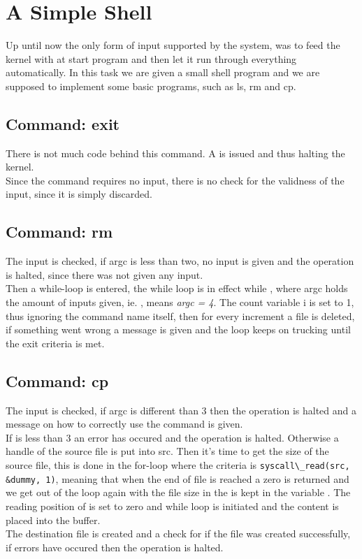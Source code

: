 %
%
%

\section{A Simple Shell}
Up until now the only form of input supported by the system, was to feed the
kernel with at start program and then let it run through everything
automatically. In this task we are given a small shell program and we are
supposed to implement some basic programs, such as ls, rm and cp.

\subsection{Command: exit}
There is not much code behind this command. A  is issued
and thus halting the kernel.\\
Since the command requires no input, there is no check for the validness of the
input, since it is simply discarded.

\subsection{Command: rm}
The input is checked, if argc is less than two, no input is given and the
operation is halted, since there was not given any input.\\
Then a while-loop is entered, the while loop is in effect while ,
where argc holds the amount of inputs given, ie. ,
means \textit{argc = 4}. The count variable i is set to 1, thus ignoring the
command name itself, then for every increment a file is deleted, if something
went wrong a message is given and the loop keeps on trucking until the exit
criteria is met. 

\subsection{Command: cp}
The input is checked, if argc is different than 3 then the operation is halted
and a message on how to correctly use the command is given.\\
If  is less than 3 an error has occured and the
operation is halted. Otherwise a handle of the source file is put into src. Then
it's time to get the size of the source file, this is done in the for-loop where
the criteria is \verb|syscall\_read(src, &dummy, 1)|, meaning that when the end
of file is reached a zero is returned and we get out of the loop again with the
file size in the is kept in the variable . The reading position of
 is set to zero and while loop is initiated and the content is placed
into the buffer.\\
The destination file is created and a check for if the file was created
successfully, if errors have occured then the operation is halted.

